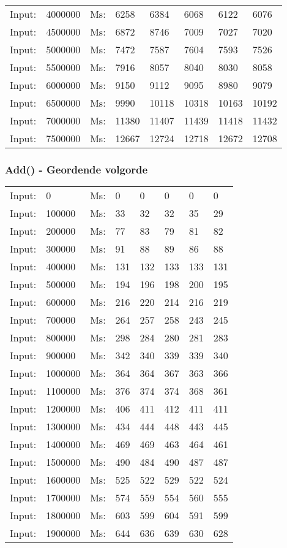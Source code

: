\documentclass[11pt,a4paper]{report}
\begin{document}
\begin{tiny}
\begin{tabular}{l l ||l  l  l  l  l  l}
Input:&4000000&Ms:&6258&6384&6068&6122&6076\\
Input:&4500000&Ms:&6872&8746&7009&7027&7020\\
Input:&5000000&Ms:&7472&7587&7604&7593&7526\\
Input:&5500000&Ms:&7916&8057&8040&8030&8058\\
Input:&6000000&Ms:&9150&9112&9095&8980&9079\\
Input:&6500000&Ms:&9990&10118&10318&10163&10192\\
Input:&7000000&Ms:&11380&11407&11439&11418&11432\\
Input:&7500000&Ms:&12667&12724&12718&12672&12708\\
\end{tabular}

\subsubsection*{Add() - Geordende volgorde}
\begin{tabular}{l l ||l  l  l  l  l  l}
Input:&0&Ms:&0&0&0&0&0\\
Input:&100000&Ms:&33&32&32&35&29\\
Input:&200000&Ms:&77&83&79&81&82\\
Input:&300000&Ms:&91&88&89&86&88\\
Input:&400000&Ms:&131&132&133&133&131\\
Input:&500000&Ms:&194&196&198&200&195\\
Input:&600000&Ms:&216&220&214&216&219\\
Input:&700000&Ms:&264&257&258&243&245\\
Input:&800000&Ms:&298&284&280&281&283\\
Input:&900000&Ms:&342&340&339&339&340\\
Input:&1000000&Ms:&364&364&367&363&366\\
Input:&1100000&Ms:&376&374&374&368&361\\
Input:&1200000&Ms:&406&411&412&411&411\\
Input:&1300000&Ms:&434&444&448&443&445\\
Input:&1400000&Ms:&469&469&463&464&461\\
Input:&1500000&Ms:&490&484&490&487&487\\
Input:&1600000&Ms:&525&522&529&522&524\\
Input:&1700000&Ms:&574&559&554&560&555\\
Input:&1800000&Ms:&603&599&604&591&599\\
Input:&1900000&Ms:&644&636&639&630&628\\

\end{tabular}
\end{tiny}
\end{document}
